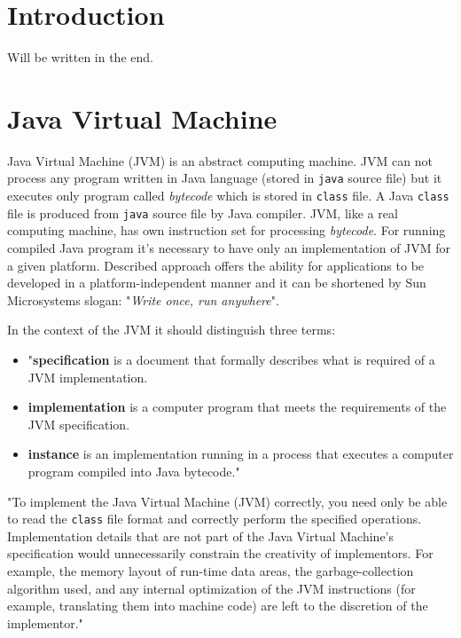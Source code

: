 \documentclass[
  digital, %
  oneside,
  notable, %
  nolof,     %
  nolot     %
]{fithesis3}
\begin{document}
\chapter{Introduction}
    Will be written in the end.

\chapter{Java Virtual Machine}

Java Virtual Machine (JVM) is an abstract computing machine. JVM can not process any program written in Java language (stored in \texttt{java} source file) but it executes only program called \textit{bytecode} which is stored in \texttt{class} file. A Java \texttt{class} file is produced from \texttt{java} source file by Java compiler. JVM, like a real computing machine, has own instruction set for processing \textit{bytecode}. For running compiled Java program it's necessary to have only an implementation of JVM for a given platform. Described approach offers the ability for applications to be developed in a platform-independent manner and it can be shortened by Sun Microsystems slogan: "\textit{Write once, run anywhere}". \cite{spec}

In the context of the JVM it should distinguish three terms:
\begin{itemize}
	\item "\textbf{specification} is a document that formally describes what is required of a JVM implementation.
	\item \textbf{implementation} is a computer program that meets the requirements of the JVM specification.
	\item \textbf{instance} is an implementation running in a process that executes a computer program compiled into Java bytecode." \cite{brief}
\end{itemize}


"To implement the Java Virtual Machine (JVM) correctly, you need only be able to read the \texttt{class} file format and correctly perform the specified operations. Implementation details that are not part of the Java Virtual Machine's specification would unnecessarily constrain the creativity of implementors. For example, the memory layout of run-time data areas, the garbage-collection algorithm used, and any internal optimization of the JVM instructions (for example, translating them into machine code) are left to the discretion of the implementor." \cite{spec}
\end{document}
